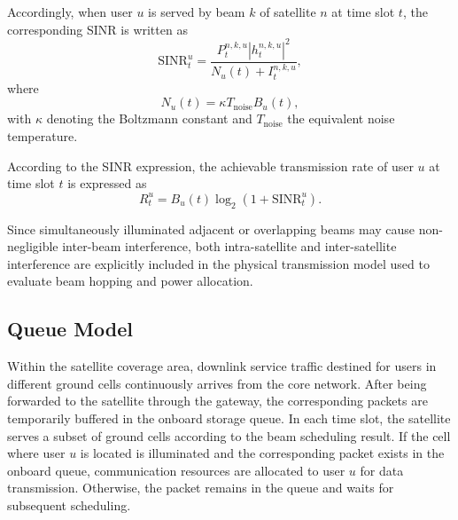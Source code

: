 \documentclass[journal]{IEEEtran}
\begin{document}
Accordingly, when user $u$ is served by beam $k$ of satellite $n$ at time slot $t$, the corresponding SINR is written as
\begin{equation}
\mathrm{SINR}_t^u
=
\frac{
{P}_t^{n,k,u}|h_t^{n,k,u}|^2
}{
N_u(t)+I_t^{n,k,u}
},
\label{eq:sinr}
\end{equation}
where
\begin{equation}
N_u(t)=\kappa T_{\mathrm{noise}}B_u(t),
\end{equation}
with $\kappa$ denoting the Boltzmann constant and $T_{\mathrm{noise}}$ the equivalent noise temperature.

According to the SINR expression, the achievable transmission rate of user $u$ at time slot $t$ is expressed as
\begin{equation}
R_t^u
=
B_u(t)\log_2(1+\mathrm{SINR}_t^u).
\label{eq:rate}
\end{equation}

Since simultaneously illuminated adjacent or overlapping beams may cause non-negligible inter-beam interference, both intra-satellite and inter-satellite interference are explicitly included in the physical transmission model used to evaluate beam hopping and power allocation.

\subsection{Queue Model}
\label{subsec:queue-model}
Within the satellite coverage area, downlink service traffic destined for users in different ground cells continuously arrives from the core network. After being forwarded to the satellite through the gateway, the corresponding packets are temporarily buffered in the onboard storage queue. In each time slot, the satellite serves a subset of ground cells according to the beam scheduling result. If the cell where user $u$ is located is illuminated and the corresponding packet exists in the onboard queue, communication resources are allocated to user $u$ for data transmission. Otherwise, the packet remains in the queue and waits for subsequent scheduling.
\end{document}
